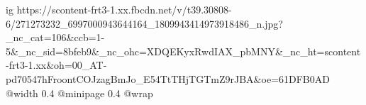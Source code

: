  
 
 
 
 

\ifcmt
  ig https://scontent-frt3-1.xx.fbcdn.net/v/t39.30808-6/271273232_6997000943644164_1809943414973918486_n.jpg?_nc_cat=106&ccb=1-5&_nc_sid=8bfeb9&_nc_ohc=XDQEKyxRwdIAX_pbMNY&_nc_ht=scontent-frt3-1.xx&oh=00_AT-pd70547hFroontCOJzagBmJo_E54TtTHjTGTmZ9rJBA&oe=61DFB0AD
  @width 0.4
  @minipage 0.4
  @wrap \parpic[r]
\fi
